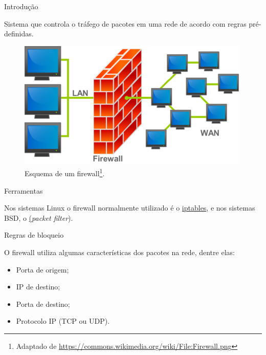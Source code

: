 

\begin{frame}{Introdução}
  
Sistema que controla o tráfego de pacotes em uma rede de acordo com
regras pré-definidas.

\begin{figure}[ht]
\centering
\includegraphics[scale=.7]{firewall.png}
\caption{Esquema de um firewall\footnote{\scriptsize Adaptado de
    \url{https://commons.wikimedia.org/wiki/File:Firewall.png}}.}
\end{figure}

\end{frame}

\begin{frame}{Ferramentas}

  Nos sistemas Linux o firewall normalmente utilizado é o
  \href{http://www.netfilter.org/projects/iptables/}{iptables}, e nos
  sistemas BSD, o \href{http://www.openbsd.org/faq/pf/} ({\em packet
    filter}).

\end{frame}

\begin{frame}{Regras de bloqueio}

  O firewall utiliza algumas características dos pacotes na rede,
  dentre elas:

\begin{itemize}
\item Porta de origem;
\item IP de destino;
\item Porta de destino;
\item Protocolo IP (TCP ou UDP).
\end{itemize}

\end{frame}
